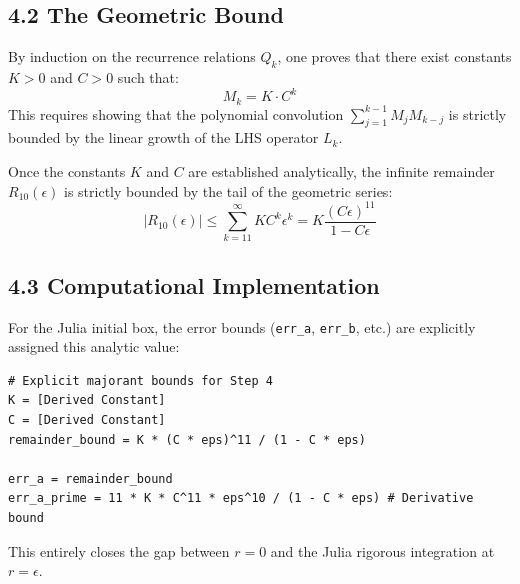 \documentclass[12pt]{article}
\begin{document}
\subsection*{4.2 The Geometric Bound}
By induction on the recurrence relations $Q_k$, one proves that there exist constants $K > 0$ and $C > 0$ such that:
\[ M_k = K \cdot C^k \]
This requires showing that the polynomial convolution $\sum_{j=1}^{k-1} M_j M_{k-j}$ is strictly bounded by the linear growth of the LHS operator $L_k$.

Once the constants $K$ and $C$ are established analytically, the infinite remainder $R_{10}(\epsilon)$ is strictly bounded by the tail of the geometric series:
\[ |R_{10}(\epsilon)| \leq \sum_{k=11}^{\infty} K C^k \epsilon^k = K \frac{(C \epsilon)^{11}}{1 - C \epsilon} \]

\subsection*{4.3 Computational Implementation}
For the Julia initial box, the error bounds (\texttt{err\_a}, \texttt{err\_b}, etc.) are explicitly assigned this analytic value:

\begin{verbatim}
# Explicit majorant bounds for Step 4
K = [Derived Constant]
C = [Derived Constant]
remainder_bound = K * (C * eps)^11 / (1 - C * eps)

err_a = remainder_bound
err_a_prime = 11 * K * C^11 * eps^10 / (1 - C * eps) # Derivative bound
\end{verbatim}

This entirely closes the gap between $r=0$ and the Julia rigorous integration at $r=\epsilon$.
\end{document}
